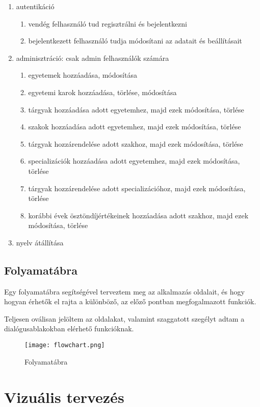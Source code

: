 \documentclass[a4paper,12pt]{report}
\begin{document}
\begin{enumerate}
    \item autentikáció
    \begin{enumerate}
        \item vendég felhasználó tud regisztrálni és bejelentkezni
        \item bejelentkezett felhasználó tudja módosítani az adatait és beállításait
    \end{enumerate}
    \item adminisztráció: csak admin felhasználók számára
    \begin{enumerate}
        \item egyetemek hozzáadása, módosítása
        \item egyetemi karok hozzáadása, törlése, módosítása
        \item tárgyak hozzáadása adott egyetemhez, majd ezek módosítása, törlése
        \item szakok hozzáadása adott egyetemhez, majd ezek módosítása, törlése
        \item tárgyak hozzárendelése adott szakhoz, majd ezek módosítása, törlése
        \item specializációk hozzáadása adott egyetemhez, majd ezek módosítása, törlése
        \item tárgyak hozzárendelése adott specializációhoz, majd ezek módosítása, törlése
        \item korábbi évek ösztöndíjértékeinek hozzáadása adott szakhoz, majd ezek módosítása, törlése
    \end{enumerate}
    \item nyelv átállítása
\end{enumerate}

\subsection{Folyamatábra}

Egy folyamatábra segítségével terveztem meg az alkalmazás oldalait, és hogy hogyan érhetők el rajta a különböző, az előző pontban megfogalmazott funkciók.

Teljesen oválisan jelöltem az oldalakat, valamint szaggatott szegélyt adtam a dialógusablakokban elérhető funkcióknak.

\begin{figure}
    \centering
    \texttt{[image: flowchart.png]}
    \caption{Folyamatábra}
\end{figure}

\section{Vizuális tervezés}
\end{document}
